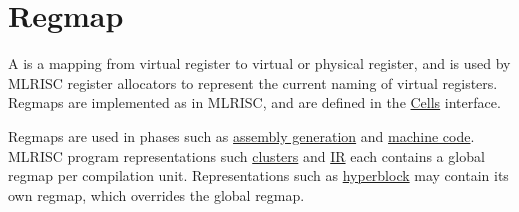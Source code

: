\section{Regmap}
A 
is a mapping from virtual register to virtual or physical
register, and is used by MLRISC register allocators to
represent the current naming of virtual registers.  Regmaps are implemented
as  
in MLRISC, and are defined in the
\href{cells.html}{Cells} interface.

Regmaps are used in phases such as 
\href{asm.html}{assembly generation} and 
\href{mc.html}{machine code}.   MLRISC program representations such
\href{cluster.html}{clusters} and \href{mlrisc-ir.html}{IR}
each contains a global regmap per compilation unit.  Representations
such as \href{hyperblock.html}{hyperblock} may contain its own
regmap, which overrides the global regmap. 
